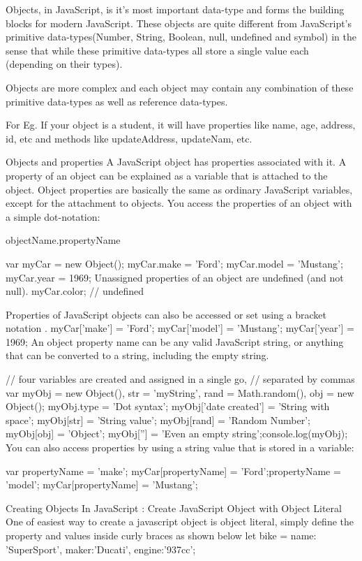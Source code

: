 Objects, in JavaScript, is it’s most important data-type and forms the building blocks for modern JavaScript. These objects are quite different from JavaScript’s primitive data-types(Number, String, Boolean, null, undefined and symbol) in the sense that while these primitive data-types all store a single value each (depending on their types).

Objects are more complex and each object may contain any combination of these primitive data-types as well as reference data-types.

For Eg. If your object is a student, it will have properties like name, age, address, id, etc and methods like updateAddress, updateNam, etc.

Objects and properties
A JavaScript object has properties associated with it. A property of an object can be explained as a variable that is attached to the object. Object properties are basically the same as ordinary JavaScript variables, except for the attachment to objects.  You access the properties of an object with a simple dot-notation:

objectName.propertyName

var myCar = new Object();
myCar.make = 'Ford';
myCar.model = 'Mustang';
myCar.year = 1969;
Unassigned properties of an object are undefined (and not null).
myCar.color; // undefined

Properties of JavaScript objects can also be accessed or set using a bracket notation .
myCar['make'] = 'Ford';
myCar['model'] = 'Mustang';
myCar['year'] = 1969;
An object property name can be any valid JavaScript string, or anything that can be converted to a string, including the empty string. 

// four variables are created and assigned in a single go, 
// separated by commas
var myObj = new Object(),
    str = 'myString',
    rand = Math.random(),
    obj = new Object();
myObj.type              = 'Dot syntax';
myObj['date created']   = 'String with space';
myObj[str]              = 'String value';
myObj[rand]             = 'Random Number';
myObj[obj]              = 'Object';
myObj['']               = 'Even an empty string';console.log(myObj);
You can also access properties by using a string value that is stored in a variable:

var propertyName = 'make';
myCar[propertyName] = 'Ford';propertyName = 'model';
myCar[propertyName] = 'Mustang';


Creating Objects In JavaScript :
Create JavaScript Object with Object Literal
One of easiest way to create a javascript object is object literal, simply define the property and values inside curly braces as shown below
let bike = {name: 'SuperSport', maker:'Ducati', engine:'937cc'};



